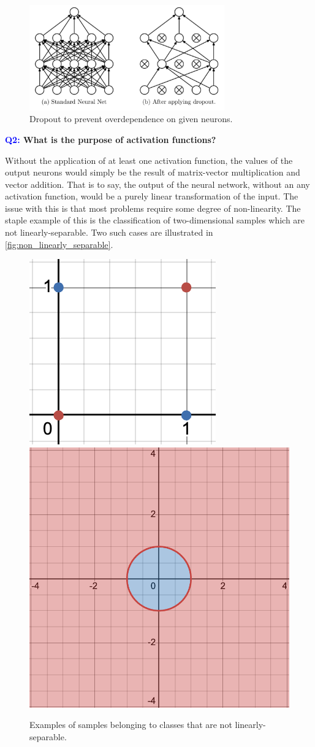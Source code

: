 \documentclass[11pt]{article}
\begin{document}
\begin{figure}[ht]
    \centering
    \includegraphics[width=0.75\textwidth]{./figures/neural_nets/REG_dropout.png}
    \caption{Dropout to prevent overdependence on given neurons.}
    \label{fig:dropout}
\end{figure}

\begin{center}
    \textbf{\textcolor{blue}{Q2:} What is the purpose of activation functions?}
\end{center}
Without the application of at least one activation function, the values of the output neurons would simply be the result of matrix-vector multiplication and vector addition. That is to say, the output of the neural network, without an any activation function, would be a purely linear transformation of the input. The issue with this is that most problems require some degree of non-linearity. The staple example of this is the classification of two-dimensional samples which are not linearly-separable. Two such cases are illustrated in \autoref{fig:non_linearly_separable}.

\begin{figure}[ht]
    \centering
    \includegraphics[width=0.40\columnwidth]{./figures/neural_nets/NLA_xor.png}
    \hspace{20pt}
    \includegraphics[width=0.40\columnwidth]{./figures/neural_nets/NLA_circle.png}
    \caption{Examples of samples belonging to classes that are not linearly-separable.}
    \label{fig:non_linearly_separable}
\end{figure}
\end{document}

